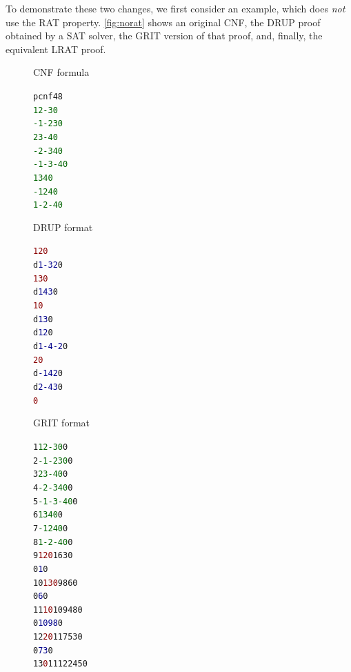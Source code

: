 \documentclass{article}
\begin{document}
To demonstrate these two changes, we first consider an example, which
does \emph{not} use the RAT property.  \autoref{fig:norat} shows an
original CNF, the DRUP proof obtained by a SAT solver, the GRIT
version of that proof, and, finally, the equivalent LRAT proof.

\begin{figure}[t]
\small
  \begin{minipage}[t]{0.175\textwidth}
CNF formula%
    \begin{alltt}
p cnf 4 8
\textcolor{darkgreen}{ 1  2 -3 0}
\textcolor{darkgreen}{-1 -2  3 0}
\textcolor{darkgreen}{ 2  3 -4 0}
\textcolor{darkgreen}{-2 -3  4 0}
\textcolor{darkgreen}{-1 -3 -4 0}
\textcolor{darkgreen}{ 1  3  4 0}
\textcolor{darkgreen}{-1  2  4 0}
\textcolor{darkgreen}{ 1 -2 -4 0}
    \end{alltt}
  \end{minipage}
  \begin{minipage}[t]{0.195\textwidth}
DRUP format%
    \begin{alltt}
  \textcolor{darkred}{    1  2 0}
d \textcolor{darkblue}{ 1 -3  2} 0
  \textcolor{darkred}{    1  3 0}
d \textcolor{darkblue}{ 1  4  3} 0
  \textcolor{darkred}{       1 0}
d \textcolor{darkblue}{    1  3} 0
d \textcolor{darkblue}{    1  2} 0
d \textcolor{darkblue}{ 1 -4 -2} 0
  \textcolor{darkred}{       2 0}
d \textcolor{darkblue}{-1  4  2} 0
d \textcolor{darkblue}{ 2 -4  3} 0
  \textcolor{darkred}{         0}
    \end{alltt}
  \end{minipage}
  \begin{minipage}[t]{0.32\textwidth}
GRIT format%
    \begin{alltt}
 1 \textcolor{darkgreen}{ 1  2 -3 0} 0
 2 \textcolor{darkgreen}{-1 -2  3 0} 0
 3 \textcolor{darkgreen}{ 2  3 -4 0} 0
 4 \textcolor{darkgreen}{-2 -3  4 0} 0
 5 \textcolor{darkgreen}{-1 -3 -4 0} 0
 6 \textcolor{darkgreen}{ 1  3  4 0} 0
 7 \textcolor{darkgreen}{-1  2  4 0} 0
 8 \textcolor{darkgreen}{ 1 -2 -4 0} 0
 9 \textcolor{darkred}{1 2 0}       \textcolor{darkyellow}{1 6 3} 0
                 0 \textcolor{darkblue}{1} 0
10 \textcolor{darkred}{1 3 0}       \textcolor{darkyellow}{9 8 6} 0
                 0 \textcolor{darkblue}{6} 0
11   \textcolor{darkred}{1 0}    \textcolor{darkyellow}{10 9 4 8} 0
            0 \textcolor{darkblue}{10 9 8} 0
12   \textcolor{darkred}{2 0}    \textcolor{darkyellow}{11 7 5 3} 0
               0 \textcolor{darkblue}{7 3} 0
13     \textcolor{darkred}{0} \textcolor{darkyellow}{11 12 2 4 5} 0
    \end{alltt}

\end{minipage}
\end{figure}
\end{document}
